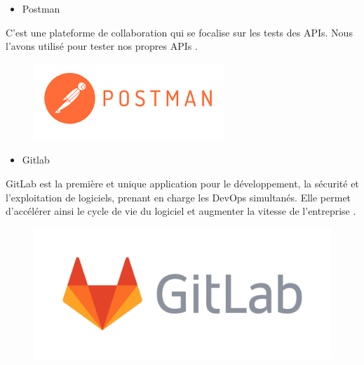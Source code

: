 \begin{itemize}
    \item 	Postman 
\end{itemize}
\par C’est une plateforme de collaboration qui se focalise sur les tests des APIs. Nous l’avons utilisé pour tester nos propres APIs \cite{7}.
\begin{figure}[h]
    \centering
    \includegraphics{figures/33anis7.png}
    \caption*{}
    \label{fig:logo_POSTMAN}
\end{figure}
\begin{itemize}
    \item 	Gitlab 
\end{itemize}
\par GitLab est la première et unique application pour le développement, la sécurité et l’exploitation de logiciels, prenant en charge les DevOps simultanés. Elle permet d’accélérer ainsi le cycle de vie du logiciel et augmenter la vitesse de l’entreprise \cite{8}.
\begin{figure}[h]
    \centering
    \includegraphics[scale=0.08]{figures/3333anis6.png}
    \caption*{}
    \label{fig:logo_GITLAB}
\end{figure}\newpage
